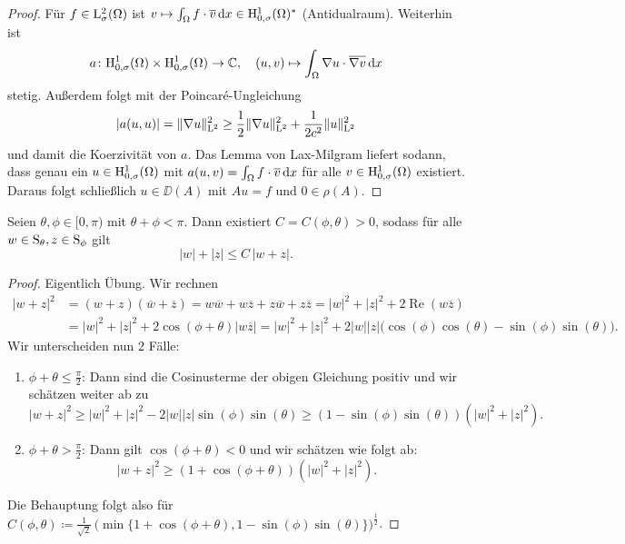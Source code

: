 \begin{proof}
  Für $f \in \mathrm{L}_\sigma^2(\Omega)$ ist $v \mapsto \int_\Omega f \cdot \overline v \, {\operatorname{d}\!{x}} \in \mathrm{H}_{0,\sigma}^1(\Omega)^*$ (Antidualraum).
  Weiterhin ist 
  $$
  a \colon \mathrm{H}_{0,\sigma}^1(\Omega) \times \mathrm{H}_{0,\sigma}^1(\Omega) \to \mathbb{C},\quad (u,v) \mapsto \int_\Omega \nabla u \cdot \overline{\nabla v} \, {\operatorname{d}\!{x}}
  $$ 
  stetig.
  Außerdem folgt mit der Poincar\'e-Ungleichung
  $$
  |a(u,u)| = \|\nabla u\|_{\mathrm{L}^2}^2 \geq \frac{1}{2} \|\nabla u\|_{\mathrm{L}^2}^2 + \frac{1}{2 c^2} \|u\|_{\mathrm{L}^2}^2
  $$
  und damit die Koerzivität von $a$.
  Das Lemma von Lax-Milgram liefert sodann, dass genau ein $u \in \mathrm{H}_{0,\sigma}^1(\Omega)$ mit $a(u,v) = \int_\Omega f \cdot \overline v \, {\operatorname{d}\!{x}}$ für alle $v \in \mathrm{H}_{0,\sigma}^1(\Omega)$ existiert.
  Daraus folgt schließlich $u \in \DD(A)$ mit $A u = f$ und $0 \in \rho(A)$.
\end{proof}

\begin{lem}
  \label{lem:inverseTriangle}
  Seien $\theta, \phi \in [0,\pi)$ mit $\theta + \phi < \pi$.
    Dann existiert $C = C(\phi,\theta) > 0$, sodass für alle $w \in \mathrm{S}_\theta, z \in \mathrm{S}_\phi$ gilt
    $$
    |w| + |z| \leq C \,|w + z|.
    $$
\end{lem}

\begin{proof}
  Eigentlich Übung. Wir rechnen
  \begin{align*}
    |w + z|^2 
    &= (w + z)(\overline w + \overline z)  
    = w \overline w + w \overline z + z \overline w + z \overline z 
    = |w|^2 + |z|^2 + 2 \operatorname{Re}(w \overline z) \\
    &= |w|^2 + |z|^2 + 2 \cos (\phi + \theta) |w \overline z|
    = |w|^2 + |z|^2 + 2|w||z| \big(\cos(\phi)\cos(\theta) - \sin(\phi)\sin(\theta)\big).
  \end{align*}
  Wir unterscheiden nun 2 Fälle:
  \begin{enumerate}[1.]
    \item $\phi +  \theta \leq \frac{\pi}{2}$: Dann sind die Cosinusterme der obigen Gleichung positiv und wir schätzen weiter ab zu
      $$
      |w + z|^2 \geq |w|^2 + |z|^2 - 2|w||z|\sin(\phi)\sin(\theta) \geq (1 - \sin(\phi)\sin(\theta)) (|w|^2 + |z|^2).
      $$
    \item $\phi + \theta > \frac{\pi}{2}$: Dann gilt $\cos(\phi + \theta) < 0$ und wir schätzen wie folgt ab:
      $$
      |w + z|^2 \geq (1 + \cos(\phi + \theta)) (|w|^2 + |z|^2 ).
      $$
  \end{enumerate}
  Die Behauptung folgt also für $C(\phi,\theta) \coloneqq \frac{1}{\sqrt{2}}\, \Big(\min\{1 + \cos(\phi + \theta), 1 - \sin(\phi)\sin(\theta)\}\Big)^{\frac{1}{2}}$.
\end{proof}

